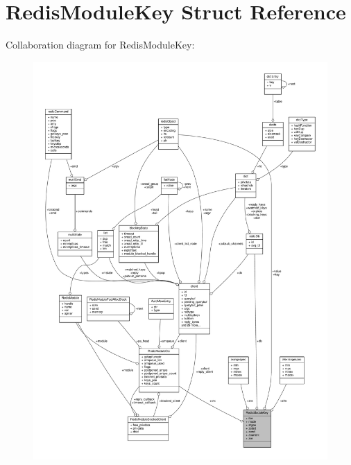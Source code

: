 \hypertarget{structRedisModuleKey}{}\section{Redis\+Module\+Key Struct Reference}
\label{structRedisModuleKey}


Collaboration diagram for Redis\+Module\+Key\+:\nopagebreak
\begin{figure}[H]
\begin{center}
\leavevmode
\includegraphics[width=350pt]{structRedisModuleKey__coll__graph}
\end{center}
\end{figure}
